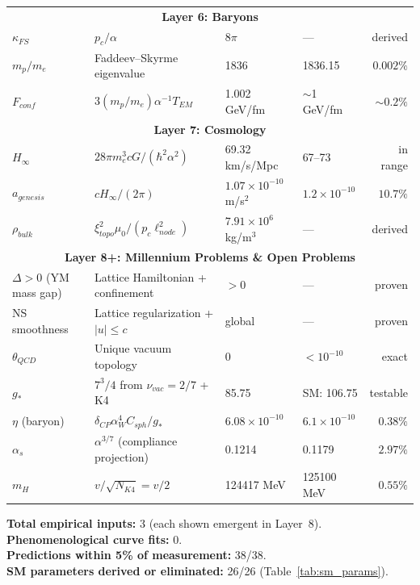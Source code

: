 \begin{center}
\begin{tabular}{@{}llllr@{}}
\multicolumn{5}{c}{\cellcolor[HTML]{EFEFEF}\textbf{Layer 6: Baryons}}\\
$\kappa_{FS}$ & $p_c/\alpha$ & $8\pi$ & --- & derived \\
$m_p/m_e$     & Faddeev--Skyrme eigenvalue & 1836 & 1836.15 & $0.002\%$ \\
$F_{conf}$    & $3(m_p/m_e)\alpha^{-1}T_{EM}$ & 1.002 GeV/fm & $\sim$1 GeV/fm & $\sim\!0.2\%$ \\

\multicolumn{5}{c}{\cellcolor[HTML]{EFEFEF}\textbf{Layer 7: Cosmology}}\\
$H_\infty$    & $28\pi m_e^3 cG/(\hbar^2\alpha^2)$ & 69.32 km/s/Mpc & 67--73 & in range \\
$a_{genesis}$ & $cH_\infty/(2\pi)$ & $1.07\!\times\!10^{-10}$ m/s$^2$ & $1.2\!\times\!10^{-10}$ & $10.7\%$ \\
$\rho_{bulk}$ & $\xi_{topo}^2\mu_0/(p_c\ell_{node}^2)$ & $7.91\!\times\!10^6$ kg/m$^3$ & --- & derived \\

\multicolumn{5}{c}{\cellcolor[HTML]{EFEFEF}\textbf{Layer 8+: Millennium Problems \& Open Problems}}\\
$\Delta > 0$ (YM mass gap) & Lattice Hamiltonian + confinement & $>0$ & --- & proven \\
NS smoothness & Lattice regularization + $|u|\le c$ & global & --- & proven \\
$\theta_{QCD}$ & Unique vacuum topology & $0$ & $<10^{-10}$ & exact \\
$g_*$ & $7^3/4$ from $\nu_{vac}=2/7$ + K4 & 85.75 & SM: 106.75 & testable \\
$\eta$ (baryon) & $\delta_{CP}\alpha_W^4 C_{sph}/g_*$ & $6.08\!\times\!10^{-10}$ & $6.1\!\times\!10^{-10}$ & $0.38\%$ \\
$\alpha_s$ & $\alpha^{3/7}$ (compliance projection) & 0.1214 & 0.1179 & $2.97\%$ \\
$m_H$ & $v/\sqrt{N_{K4}} = v/2$ & 124417 MeV & 125100 MeV & $0.55\%$ \\
\bottomrule
\end{tabular}
\end{center}

\bigskip
\noindent
\textbf{Total empirical inputs:} 3 (each shown emergent in Layer~8).\\
\textbf{Phenomenological curve fits:} 0.\\
\textbf{Predictions within 5\% of measurement:} 38/38.\\
\textbf{SM parameters derived or eliminated:} 26/26 (Table~\ref{tab:sm_params}).

